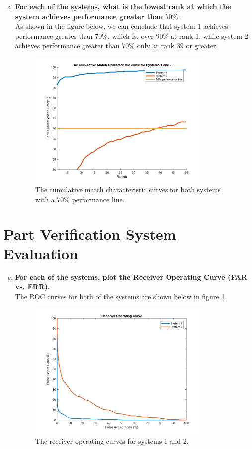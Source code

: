 \documentclass[a4paper]{article}
\begin{document}
\begin{spacing}{2.0}
\begin{enumerate}[(a)]
		\item \textbf{For each of the systems, what is the lowest rank at which the system achieves 				performance greater than $70\%$}.\\
		As shown in the figure below, we can conclude that system 1 achieves performance greater than 		$70\%$, which is, over $90\%$ at rank 1, while system 2 achieves performance greater than $70\%		$ only at rank 39 or greater.
		\begin{figure}[h]
		\centering
		\includegraphics[width = 3.5in]{CMCwithLine.jpg}
		\caption{The cumulative match characteristic curves for both systems with a $70\%$ performance line.}
		\end{figure}
	\end{enumerate}

\newpage	
\section*{\huge\textbf{ Part \uppercase\expandafter{} Verification System Evaluation}  }
	\normalsize
	\begin{enumerate}[(a)]
	\setcounter{enumi}{4}
	\item \textbf{For each of the systems, plot the Receiver Operating Curve (FAR vs. FRR).}\\
	The ROC curves for both of the systems are shown below in figure \ref{ROC}. 
	\begin{figure}[h]
	\centering
	\includegraphics[width = 3.5in]{ROC.jpg}
	\caption{The receiver operating curves for systems 1 and 2.}
	\label{ROC}
	\end{figure}
	

\end{enumerate}
\end{spacing}
\end{document}
